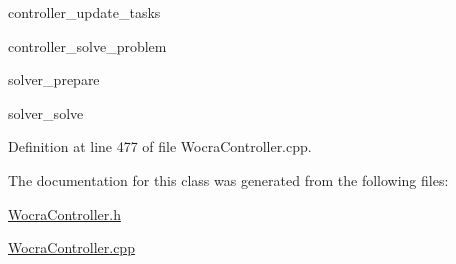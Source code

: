 \begin{DoxyItemize}
\item controller\+\_\+update\+\_\+tasks
\item controller\+\_\+solve\+\_\+problem
\item solver\+\_\+prepare
\item solver\+\_\+solve 
\end{DoxyItemize}

Definition at line 477 of file Wocra\+Controller.\+cpp.



The documentation for this class was generated from the following files\+:\begin{DoxyCompactItemize}
\item 
\hyperlink{WocraController_8h}{Wocra\+Controller.\+h}\item 
\hyperlink{WocraController_8cpp}{Wocra\+Controller.\+cpp}\end{DoxyCompactItemize}
